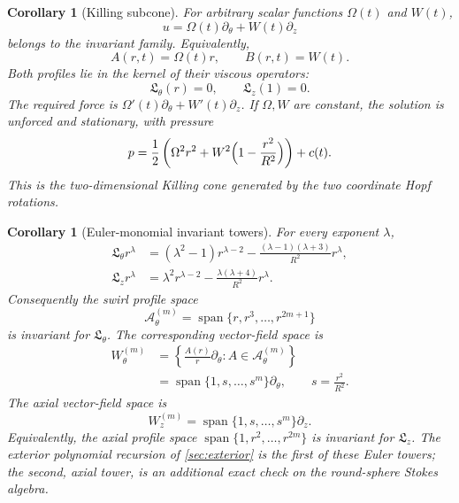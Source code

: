\documentclass[aps,prd,reprint,superscriptaddress,nofootinbib,floatfix]{revtex4-2}
\newtheorem{corollary}[theorem]{Corollary}
\theoremstyle{definition}
\theoremstyle{remark}
\begin{document}
\begin{corollary}[Killing subcone]\label{cor:KillingCone}
	For arbitrary scalar functions $\Omega(t)$ and $W(t)$,
	\begin{equation}
		u=\Omega(t)\partial_\theta+W(t)\partial_z
	\end{equation}
	belongs to the invariant family.  Equivalently,
	\[
		A(r,t)=\Omega(t)r,\qquad B(r,t)=W(t).
	\]
	Both profiles lie in the kernel of their viscous operators:
	\[
		\mathfrak L_\theta(r)=0,\qquad \mathfrak L_z(1)=0.
	\]
	The required force is $\Omega'(t)\partial_\theta+W'(t)\partial_z$.  If
	$\Omega,W$ are constant, the solution is unforced and stationary, with pressure
	\begin{equation}
		p=\frac12\left(\Omega^2r^2+W^2\Bigl(1-\frac{r^2}{R^2}\Bigr)\right)+c(t).
	\end{equation}
	This is the two-dimensional Killing cone generated by the two coordinate Hopf
	rotations.
\end{corollary}

\begin{corollary}[Euler-monomial invariant towers]\label{cor:EulerTowers}
	For every exponent $\lambda$,
	\begin{align}
		\mathfrak L_\theta r^\lambda
		 & = (\lambda^2-1)r^{\lambda-2}
		-\frac{(\lambda-1)(\lambda+3)}{R^2}r^\lambda,
		\label{eq:thetaMonomial}        \\
		\mathfrak L_z r^\lambda
		 & = \lambda^2 r^{\lambda-2}
		-\frac{\lambda(\lambda+4)}{R^2}r^\lambda.
		\label{eq:zMonomial}
	\end{align}
	Consequently the swirl profile space
	\[
		\mathcal A_\theta^{(m)}=\operatorname{span}\{r,r^3,\ldots,r^{2m+1}\}
	\]
	is invariant for \(\mathfrak L_\theta\).  The corresponding vector-field space is
	\[
		\begin{aligned}
		W_\theta^{(m)}
		&=
		\left\{\frac{A(r)}{r}\partial_\theta:
		A\in\mathcal A_\theta^{(m)}\right\} \\
		&=
		\operatorname{span}\{1,s,\ldots,s^m\}\partial_\theta,
		\qquad s=\frac{r^2}{R^2}.
		\end{aligned}
	\]
	The axial vector-field space is
	\[
		W_z^{(m)}
		=
		\operatorname{span}\{1,s,\ldots,s^m\}\partial_z .
	\]
	Equivalently, the axial profile space
	\(\operatorname{span}\{1,r^2,\ldots,r^{2m}\}\) is invariant for \(\mathfrak L_z\).  The exterior polynomial recursion of
	\cref{sec:exterior} is the first of these Euler towers; the second, axial tower,
	is an additional exact check on the round-sphere Stokes algebra.
\end{corollary}
\end{document}
